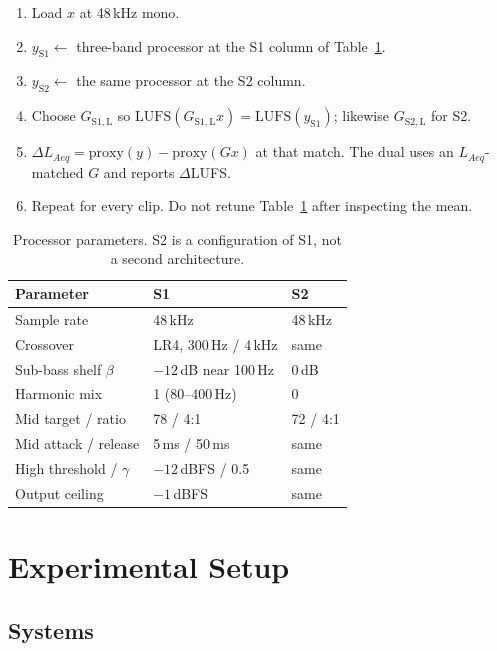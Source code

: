 \documentclass[12pt,journal,onecolumn]{IEEEtran}
\begin{document}
\begin{enumerate}
\item Load $x$ at 48\,kHz mono.
\item $y_{\mathrm{S1}}\leftarrow$ three-band processor at the S1 column of Table~\ref{tab:params}.
\item $y_{\mathrm{S2}}\leftarrow$ the same processor at the S2 column.
\item Choose $G_{\mathrm{S1,L}}$ so $\mathrm{LUFS}(G_{\mathrm{S1,L}}x)=\mathrm{LUFS}(y_{\mathrm{S1}})$; likewise $G_{\mathrm{S2,L}}$ for S2.
\item $\Delta L_{Aeq}=\mathrm{proxy}(y)-\mathrm{proxy}(Gx)$ at that match. The dual uses an $L_{Aeq}$-matched $G$ and reports $\Delta$LUFS.
\item Repeat for every clip. Do not retune Table~\ref{tab:params} after inspecting the mean.
\end{enumerate}

\begin{table}[!htbp]
\caption{Processor parameters. S2 is a configuration of S1, not a second architecture.}
\label{tab:params}
\centering
\renewcommand{\arraystretch}{1.12}
\begin{tabular}{l l l}
\hline
Parameter & S1 & S2 \\
\hline
Sample rate & 48\,kHz & 48\,kHz \\
Crossover & LR4, 300\,Hz / 4\,kHz & same \\
Sub-bass shelf $\beta$ & $-12$\,dB near 100\,Hz & $0$\,dB \\
Harmonic mix & 1 ($80$--$400$\,Hz) & 0 \\
Mid target / ratio & 78 / 4:1 & 72 / 4:1 \\
Mid attack / release & 5\,ms / 50\,ms & same \\
High threshold / $\gamma$ & $-12$\,dBFS / 0.5 & same \\
Output ceiling & $-1$\,dBFS & same \\
\hline
\end{tabular}
\end{table}

\section{Experimental Setup}
\label{sec:setup}

\subsection{Systems}
\end{document}
